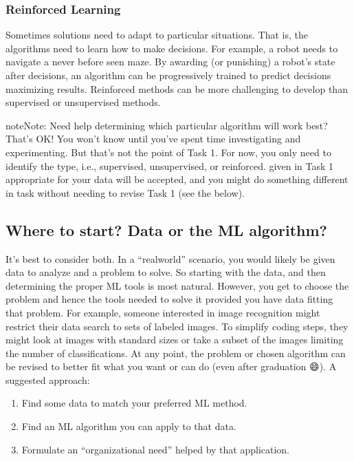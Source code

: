 \documentclass[letterpaper,10pt,english]{jupyterBook}
\begin{document}
\subsubsection{Reinforced Learning}
\label{\detokenize{task1:reinforced-learning}}
\sphinxAtStartPar
Sometimes solutions need to adapt to particular situations. That is, the algorithms need to learn how to make decisions. For example, a robot needs to navigate a never before seen maze. By awarding (or punishing) a robot’s state after decisions, an algorithm can be progressively trained to predict decisions maximizing results. Reinforced methods can be more challenging to develop than supervised or unsupervised methods.

\begin{sphinxadmonition}{note}{Note:}
\sphinxAtStartPar
Need help determining which particular algorithm will work best? That’s OK! You won’t know until you’ve spent time investigating and experimenting. But that’s not the point of Task 1. For now, you only need to identify the type, i.e., supervised, unsupervised, or reinforced.  given in Task 1 appropriate for your data will be accepted, and you might do something different in task without needing to revise Task 1 (see the {\hyperref[\detokenize{task1:task1-faq-change-task1}]{}} below).
\end{sphinxadmonition}


\subsection{Where to start? Data or the ML algorithm?}
\label{\detokenize{task1:where-to-start-data-or-the-ml-algorithm}}
\sphinxAtStartPar
It’s best to consider both. In a “real\sphinxhyphen{}world” scenario, you would likely be given data to analyze and a problem to solve. So starting with the data, and then determining the proper ML tools is most natural. However, you get to choose the problem and hence the tools needed to solve it \sphinxhyphen{}provided you have data fitting that problem. For example, someone interested in image recognition might restrict their data search to sets of labeled images. To simplify coding steps, they might look at images with standard sizes or take a subset of the images limiting the number of classifications. At any point, the problem or chosen algorithm can be revised to better fit what you want or can do (even after graduation 😄). A suggested approach:
\begin{enumerate}
%
\item {} 
\sphinxAtStartPar
Find some data to match your preferred ML method.

\item {} 
\sphinxAtStartPar
Find an ML algorithm you can apply to that data.

\item {} 
\sphinxAtStartPar
Formulate an “organizational need” helped by that application.

\end{enumerate}
\end{document}

